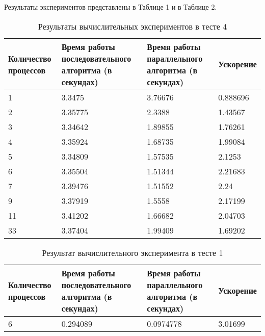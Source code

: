 \documentclass{report}
\begin{document}
\par Результаты экспериментов представлены в Таблице 1 и в Таблице 2.

\begin{table}[!h]
\caption{Результаты вычислительных экспериментов в тесте 4}
\centering
\begin{tabular}{| p{2cm} | p{3cm} | p{4cm} | p{2cm} |}
\hline
Количество процессов & Время работы последовательного алгоритма (в секундах) & Время работы параллельного алгоритма (в секундах) & Ускорение  \\[5pt]
\hline
1        & 3.3475        & 3.76676     & 0.888696       \\
2        & 3.35775        & 2.3388     & 1.43567       \\
3        & 3.34642        & 1.89855     & 1.76261       \\
4        & 3.35924        & 1.68735     & 1.99084       \\
5        & 3.34809        & 1.57535     & 2.1253       \\
6        & 3.35504        & 1.51344     & 2.21683       \\
7        & 3.39476        & 1.51552     & 2.24       \\
9        & 3.37919        & 1.5558     & 2.17199	    \\
11        & 3.41202        & 1.66682     & 2.04703	  \\
33        & 3.37404        & 1.99409     & 1.69202	  \\
\hline
\end{tabular}
\end{table}

\begin{table}[!h]
\caption{Результат вычислительного эксперимента в тесте 1}
\centering
\begin{tabular}{| p{2cm} | p{3cm} | p{4cm} | p{2cm} |}
\hline
Количество процессов & Время работы последовательного алгоритма (в секундах) & Время работы параллельного алгоритма (в секундах) & Ускорение  \\[5pt]
\hline
6        & 0.294089        & 0.0974778     & 3.01699       \\
\hline
\end{tabular}
\end{table}

\newpage

\end{document}

